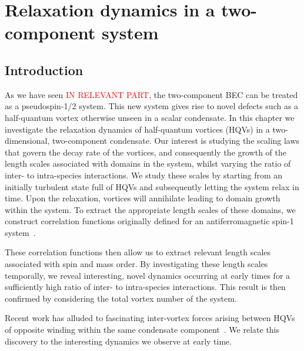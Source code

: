 \chapter{Relaxation dynamics in a two-component system}

\section{Introduction}
As we have seen \textcolor{red}{IN RELEVANT PART}, the two-component BEC can be 
treated as a pseudospin-1/2 system. 
This new system gives rise to novel defects such as a half-quantum vortex 
otherwise unseen in a scalar condensate. 
In this chapter we investigate the relaxation dynamics of half-quantum vortices 
(HQVs) in a two-dimensional, two-component condensate. 
Our interest is studying the scaling laws that govern the decay rate of the 
vortices, and consequently the growth of the length scales associated with 
domains in the system, whilst varying the ratio of inter- to intra-species 
interactions. 
We study these scales by starting from an initially turbulent state full of 
HQVs and subsequently letting the system relax in time. 
Upon the relaxation, vortices will annihilate leading to domain growth within 
the system.
To extract the appropriate length scales of these domains, we construct 
correlation functions originally defined for an antiferromagnetic spin-1 
system~\cite{Symes2017}.

These correlation functions then allow us to extract relevant length scales 
associated with spin and mass order. 
By investigating these length scales temporally, we reveal interesting, 
novel dynamics occurring at early times for a sufficiently high ratio of 
inter- to intra-species interactions. 
This result is then confirmed by considering the total vortex number of the 
system. 
\par
Recent work has alluded to fascinating inter-vortex forces arising between HQVs 
of opposite winding within the same condensate 
component~\cite{Eto2011,Kasamatsu2016}.
We relate this discovery to the interesting 
dynamics we observe at early time.

